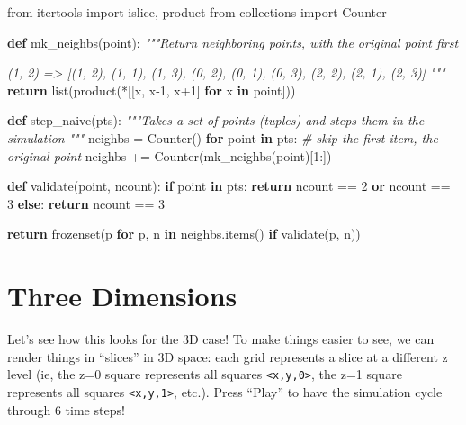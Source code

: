 \documentclass[]{article}
\newenvironment{Shaded}{}{}
\newcommand{\BuiltInTok}[1]{#1}
\newcommand{\CommentTok}[1]{\textcolor[rgb]{0.38,0.63,0.69}{\textit{#1}}}
\newcommand{\ControlFlowTok}[1]{\textcolor[rgb]{0.00,0.44,0.13}{\textbf{#1}}}
\newcommand{\DecValTok}[1]{\textcolor[rgb]{0.25,0.63,0.44}{#1}}
\newcommand{\ImportTok}[1]{#1}
\newcommand{\KeywordTok}[1]{\textcolor[rgb]{0.00,0.44,0.13}{\textbf{#1}}}
\newcommand{\NormalTok}[1]{#1}
\newcommand{\OperatorTok}[1]{\textcolor[rgb]{0.40,0.40,0.40}{#1}}
\begin{document}
\begin{Shaded}
\begin{Highlighting}[]
\ImportTok{from}\NormalTok{ itertools }\ImportTok{import}\NormalTok{ islice, product}
\ImportTok{from}\NormalTok{ collections }\ImportTok{import}\NormalTok{ Counter}

\KeywordTok{def}\NormalTok{ mk\_neighbs(point):}
    \CommentTok{"""Return neighboring points, with the original point first}

\CommentTok{    (1, 2)}
\CommentTok{    => [(1, 2), (1, 1), (1, 3), (0, 2), (0, 1), (0, 3), (2, 2), (2, 1), (2, 3)]}
\CommentTok{    """}
    \ControlFlowTok{return} \BuiltInTok{list}\NormalTok{(product(}\OperatorTok{*}\NormalTok{[[x, x}\DecValTok{{-}1}\NormalTok{, x}\OperatorTok{+}\DecValTok{1}\NormalTok{] }\ControlFlowTok{for}\NormalTok{ x }\KeywordTok{in}\NormalTok{ point]))}

\KeywordTok{def}\NormalTok{ step\_naive(pts):}
    \CommentTok{"""Takes a set of points (tuples) and steps them in the simulation}
\CommentTok{    """}
\NormalTok{    neighbs }\OperatorTok{=}\NormalTok{ Counter()}
    \ControlFlowTok{for}\NormalTok{ point }\KeywordTok{in}\NormalTok{ pts:}
        \CommentTok{\# skip the first item, the original point}
\NormalTok{        neighbs }\OperatorTok{+=}\NormalTok{ Counter(mk\_neighbs(point)[}\DecValTok{1}\NormalTok{:])}

    \KeywordTok{def}\NormalTok{ validate(point, ncount):}
        \ControlFlowTok{if}\NormalTok{ point }\KeywordTok{in}\NormalTok{ pts:}
            \ControlFlowTok{return}\NormalTok{ ncount }\OperatorTok{==} \DecValTok{2} \KeywordTok{or}\NormalTok{ ncount }\OperatorTok{==} \DecValTok{3}
        \ControlFlowTok{else}\NormalTok{:}
            \ControlFlowTok{return}\NormalTok{ ncount }\OperatorTok{==} \DecValTok{3}

    \ControlFlowTok{return} \BuiltInTok{frozenset}\NormalTok{(p }\ControlFlowTok{for}\NormalTok{ p, n }\KeywordTok{in}\NormalTok{ neighbs.items() }\ControlFlowTok{if}\NormalTok{ validate(p, n))}
\end{Highlighting}
\end{Shaded}

\hypertarget{three-dimensions}{%
\section{Three Dimensions}\label{three-dimensions}}

Let's see how this looks for the 3D case! To make things easier to see, we can
render things in ``slices'' in 3D space: each grid represents a slice at a
different z level (ie, the z=0 square represents all squares
\texttt{\textless{}x,y,0\textgreater{}}, the z=1 square represents all squares
\texttt{\textless{}x,y,1\textgreater{}}, etc.). Press ``Play'' to have the
simulation cycle through 6 time steps!
\end{document}

